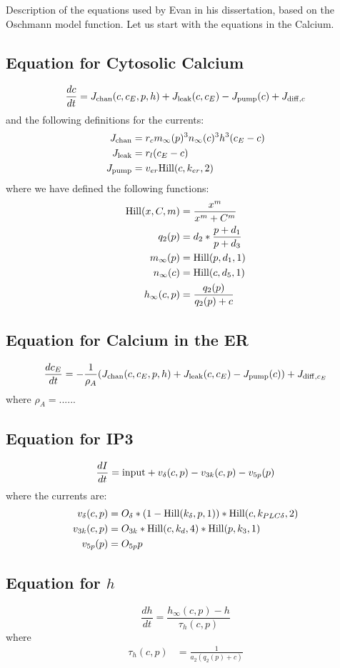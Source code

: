 \documentclass[11pt]{article}
\def\Hill{{\rm Hill}}
\def\diff{{\rm diff}}
\def\chan{{\rm chan}}
\def\pump{{\rm pump}}
\def\leak{{\rm leak}}
\begin{document}
Description of the equations used by Evan in his dissertation, based on the Oschmann model function. 
Let us start with the equations in the Calcium. 

\subsection{Equation for Cytosolic Calcium}
$$
\frac{dc}{dt} = J_{\chan}(c,c_E,p,h) + J_{\leak}(c,c_E) - J_{\pump}(c) + J_{\diff,c}
$$
and the following definitions for the currents: 
\begin{align}
  J_{\chan} &= r_c m_\infty(p)^3 n_\infty(c)^3 h^3 (c_E-c) \\
  J_{\leak} &= r_l (c_E - c) \\
  J_{\pump} &= v_{er} \Hill(c,k_{er}, 2)
\end{align}
where we have defined the following functions: 
\begin{align}
\Hill(x, C, m) &= \frac{x^m}{x^m+C^m} \\
q_2(p) &= d_2 * \frac{p +d_1}{p + d_3}\\
m_\infty(p) &= \Hill(p, d_1, 1)  \\
n_\infty(c) &= \Hill(c, d_5, 1)  \\
h_\infty(c, p) &= \frac{q_2(p)}{q_2(p) + c}
\end{align}

\subsection{Equation for Calcium in the ER}
$$
\frac{dc_E}{dt} = -\frac{1}{\rho_A} (J_{\chan}(c,c_E,p,h) + J_{\leak}(c,c_E) - J_{\pump}(c)) + J_{\diff,c_E}
$$
where $\rho_A= ......$

\subsection{Equation for IP3 }
$$
\frac{dI}{dt} = {\rm input} + v_\delta(c,p)  - v_{3k}(c,p) - v_{5p}(p)
$$
where the currents are: 
\begin{align}
v_\delta(c,p) &=  O_\delta * (1 - \Hill(k_\delta, p, 1) ) * \Hill(c,k_{PLC\delta},2)  \\
v_{3k}(c,p) &= O_{3k} * \Hill(c,k_d,4) * \Hill(p, k_3, 1) \\
v_{5p}(p) &= O_{5p} p
\end{align}

\subsection{Equation for $h$}
$$
\frac{dh}{dt} = \frac{h_\infty(c,p)-h}{\tau_h(c,p)}
$$
where
\begin{align}
\tau_h(c,p) &= \frac{1}{a_2 (q_2(p) + c)}
\end{align}
\end{document}
